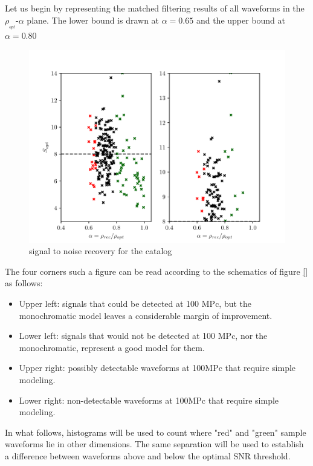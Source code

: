 Let us begin by representing the matched filtering results of all waveforms in the $\rho_{_{opt}}$-$\alpha$ plane. The lower bound is drawn at $\alpha=0.65$ and the upper bound at $\alpha=0.80$


\begin{figure}[hbt!]
\begin{center}
\includegraphics[width=\textwidth, angle=0]{images/Data_analysis/results/alpha_scatter.pdf}
\caption{signal to noise recovery for the catalog}
\label{ascatter}
\end{center}
\end{figure}

\FloatBarrier


The four corners such a figure can be read according to the schematics of figure \ref{} as follows:

\begin{itemize}
\item Upper left: signals that could be detected at 100 MPc, but the monochromatic model leaves a considerable margin of improvement.
\item Lower left: signals that would not be detected at 100 MPc, nor the monochromatic, represent a good model for them.
\item 
Upper right: possibly detectable waveforms at 100MPc that require simple modeling.
\item 
Lower right: non-detectable waveforms at 100MPc that require simple modeling.
\end{itemize}

\newpage

In what follows, histograms will be used to count where   "red" and "green" sample waveforms lie in other dimensions. The same separation will be used to establish a difference between waveforms above and below the optimal SNR threshold.

